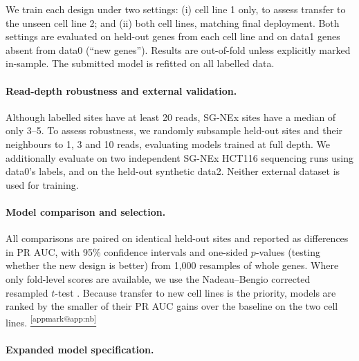 \documentclass[11pt,a4paper]{article}
\makeatletter
\DeclareRobustCommand{\applink}[1]{%
    \hyperref[#1]{\textsuperscript{\ref*{appmark@#1}}}}
\makeatother
\begin{document}
We train each design under two settings: (i) cell line 1 only, to assess transfer to the unseen cell line 2; and (ii) both cell lines, matching final deployment. Both settings are evaluated on held-out genes from each cell line and on data1 genes absent from data0 (``new genes''). Results are out-of-fold unless explicitly marked in-sample. The submitted model is refitted on all labelled data.

\paragraph{Read-depth robustness and external validation.}
Although labelled sites have at least 20 reads, SG-NEx sites have a median of only 3--5. To assess robustness, we randomly subsample held-out sites and their neighbours to 1, 3 and 10 reads, evaluating models trained at full depth. We additionally evaluate on two independent SG-NEx HCT116 sequencing runs using data0's labels, and on the held-out synthetic data2. Neither external dataset is used for training.

\paragraph{Model comparison and selection.}
All comparisons are paired on identical held-out sites and reported as differences in PR AUC, with 95\% confidence intervals and one-sided $p$-values (testing whether the new design is better) from 1,000 resamples of whole genes. Where only fold-level scores are available, we use the Nadeau--Bengio corrected resampled $t$-test \citep{nadeau2003}. Because transfer to new cell lines is the priority, models are ranked by the smaller of their PR AUC gains over the baseline on the two cell lines.\applink{app:nb}

\paragraph{Expanded model specification.}
\end{document}
